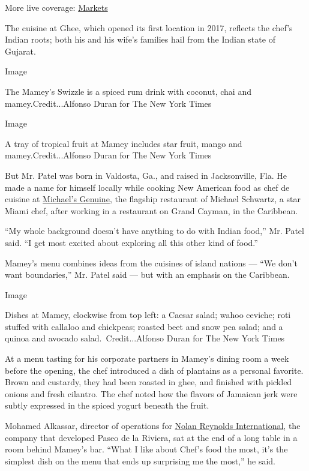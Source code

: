 More live coverage:
\href{https://www.nytimes3xbfgragh.onion/live/2020/08/20/business/stock-market-today-coronavirus?action=click\&pgtype=Article\&state=default\&region=MAIN_CONTENT_1\&context=storylines_live_updates}{Markets}

The cuisine at Ghee, which opened its first location in 2017, reflects
the chef's Indian roots; both his and his wife's families hail from the
Indian state of Gujarat.

Image

The Mamey's Swizzle is a spiced rum drink with coconut, chai and
mamey.Credit...Alfonso Duran for The New York Times

Image

A tray of tropical fruit at Mamey includes star fruit, mango and
mamey.Credit...Alfonso Duran for The New York Times

But Mr. Patel was born in Valdosta, Ga., and raised in Jacksonville,
Fla. He made a name for himself locally while cooking New American food
as chef de cuisine at \href{https://michaelsgenuine.com/}{Michael's
Genuine}, the flagship restaurant of Michael Schwartz, a star Miami
chef, after working in a restaurant on Grand Cayman, in the Caribbean.

``My whole background doesn't have anything to do with Indian food,''
Mr. Patel said. ``I get most excited about exploring all this other kind
of food.''

Mamey's menu combines ideas from the cuisines of island nations --- ``We
don't want boundaries,'' Mr. Patel said --- but with an emphasis on the
Caribbean.

Image

Dishes at Mamey, clockwise from top left: a Caesar salad; wahoo ceviche;
roti stuffed with callaloo and chickpeas; roasted beet and snow pea
salad; and a quinoa and avocado salad.~Credit...Alfonso Duran for The
New York Times

At a menu tasting for his corporate partners in Mamey's dining room a
week before the opening, the chef introduced a dish of plantains as a
personal favorite. Brown and custardy, they had been roasted in ghee,
and finished with pickled onions and fresh cilantro. The chef noted how
the flavors of Jamaican jerk were subtly expressed in the spiced yogurt
beneath the fruit.

Mohamed Alkassar, director of operations for
\href{https://www.nrinternational.com/}{Nolan Reynolds International},
the company that developed Paseo de la Riviera, sat at the end of a long
table in a room behind Mamey's bar. ``What I like about Chef's food the
most, it's the simplest dish on the menu that ends up surprising me the
most,'' he said.

